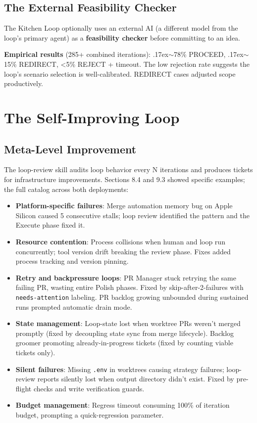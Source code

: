 \documentclass[11pt,a4paper]{article}
\newcommand{\roughly}{{\textraisebox{.17ex}{$\scriptstyle\sim$}}}
\newcommand{\textraisebox}[2]{\leavevmode\raise#1\hbox{#2}}
\begin{document}
\subsection{The External Feasibility Checker}\label{sec:external-feasibility-checker}

The Kitchen Loop optionally uses an external AI (a different model from the loop's primary agent) as a \textbf{feasibility checker} before committing to an idea.

\textbf{Empirical results} (285+ combined iterations): \roughly78\% PROCEED, \roughly15\% REDIRECT, \textless5\% REJECT + timeout. The low rejection rate suggests the loop's scenario selection is well-calibrated. REDIRECT cases adjusted scope productively.


\section{The Self-Improving Loop}\label{sec:self-improving-loop}

\subsection{Meta-Level Improvement}\label{sec:meta-level-improvement}

The loop-review skill audits loop behavior every N iterations and produces tickets for infrastructure improvements. Sections 8.4 and 9.3 showed specific examples; the full catalog across both deployments:

\begin{itemize}[nosep]
\item
  \textbf{Platform-specific failures}: Merge automation memory bug on Apple Silicon caused 5 consecutive stalls; loop review identified the pattern and the Execute phase fixed it.
\item
  \textbf{Resource contention}: Process collisions when human and loop run concurrently; tool version drift breaking the review phase. Fixes added process tracking and version pinning.
\item
  \textbf{Retry and backpressure loops}: PR Manager stuck retrying the same failing PR, wasting entire Polish phases. Fixed by skip-after-2-failures with \texttt{needs-attention} labeling. PR backlog growing unbounded during sustained runs prompted automatic drain mode.
\item
  \textbf{State management}: Loop-state lost when worktree PRs weren't merged promptly (fixed by decoupling state sync from merge lifecycle). Backlog groomer promoting already-in-progress tickets (fixed by counting viable tickets only).
\item
  \textbf{Silent failures}: Missing \texttt{.env} in worktrees causing strategy failures; loop-review reports silently lost when output directory didn't exist. Fixed by pre-flight checks and write verification guards.
\item
  \textbf{Budget management}: Regress timeout consuming 100\% of iteration budget, prompting a quick-regression parameter.
\end{itemize}
\end{document}
